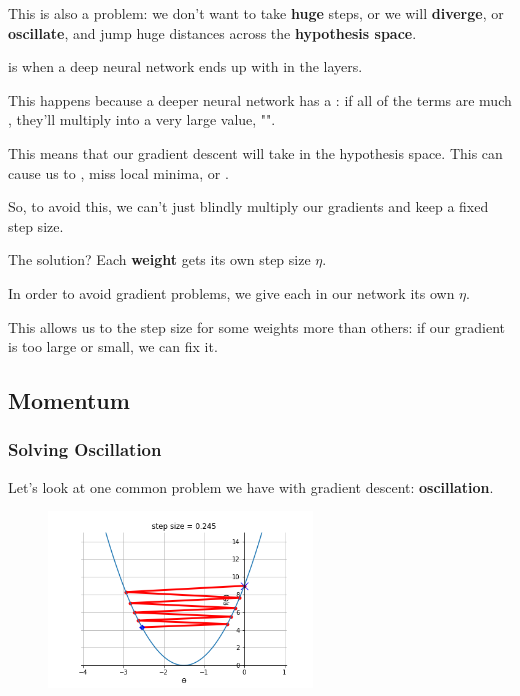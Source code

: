         This is also a problem: we don't want to take \textbf{huge} steps, or we will \textbf{diverge}, or \textbf{oscillate}, and jump huge distances across the \textbf{hypothesis space}.\\
        
        \begin{definition}
             is when a deep neural network ends up with  in the  layers. 
            
            This happens because a deeper neural network has a : if all of the terms are much , they'll multiply into a very large value, "".
            
            This means that our gradient descent will take  in the hypothesis space. This can cause us to , miss local minima, or .
        \end{definition}
        
        So, to avoid this, we can't just blindly multiply our gradients and keep a fixed step size.
        
        The solution? Each \textbf{weight} gets its own step size $\eta$.\\
        
        \begin{concept}
            In order to avoid  gradient problems, we give each  in our network its own  $\eta$.
            
            This allows us to  the step size for some weights more than others: if our gradient is too large or small, we can fix it.
        \end{concept}
    \secdiv
    
    \subsection{Momentum}
    
        \subsubsection{Solving Oscillation}
    
            Let's look at one common problem we have with gradient descent: \textbf{oscillation}. 
            
            \begin{figure}[H]
                \centering
                    \includegraphics[width=70mm,scale=0.5]{images/gradient_descent_images/oscillate.png}
            \end{figure}
            
